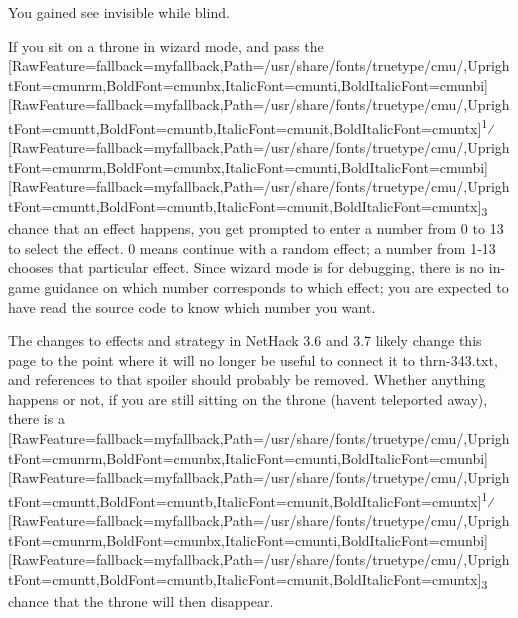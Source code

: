 \begin{myquote}
\item{}You gained see invisible while blind.
\end{myquote}

If you sit on a throne in wizard mode\footnotemark[64], and pass the \allowbreak{}\setmainfont{cmunrm.ttf}[RawFeature={fallback=myfallback},Path=/usr/share/fonts/truetype/cmu/,UprightFont=cmunrm,BoldFont=cmunbx,ItalicFont=cmunti,BoldItalicFont=cmunbi]\setmonofont{cmunrm.ttf}[RawFeature={fallback=myfallback},Path=/usr/share/fonts/truetype/cmu/,UprightFont=cmuntt,BoldFont=cmuntb,ItalicFont=cmunit,BoldItalicFont=cmuntx]\textsuperscript{1}⁄\allowbreak{}\setmainfont{cmunrm.ttf}[RawFeature={fallback=myfallback},Path=/usr/share/fonts/truetype/cmu/,UprightFont=cmunrm,BoldFont=cmunbx,ItalicFont=cmunti,BoldItalicFont=cmunbi]\setmonofont{cmunrm.ttf}[RawFeature={fallback=myfallback},Path=/usr/share/fonts/truetype/cmu/,UprightFont=cmuntt,BoldFont=cmuntb,ItalicFont=cmunit,BoldItalicFont=cmuntx]\textsubscript{3} chance that an effect happens, you get prompted to enter a number from 0 to 13 to select the effect. 0 means continue with a random effect; a number from 1-{}13 chooses that particular effect. Since wizard mode is for debugging, there is no in-{}game guidance on which number corresponds to which effect; you are expected to have read the source code to know which number you want.



The changes to effects and strategy in NetHack 3.6 and 3.7 likely change this page to the point where it will no longer be useful to connect it to thrn-{}343.txt, and references to that spoiler should probably be removed.
Whether anything happens or not, if you are still sitting on the throne (haven\textquotesingle{}t teleported away), there is a \allowbreak{}\setmainfont{cmunrm.ttf}[RawFeature={fallback=myfallback},Path=/usr/share/fonts/truetype/cmu/,UprightFont=cmunrm,BoldFont=cmunbx,ItalicFont=cmunti,BoldItalicFont=cmunbi]\setmonofont{cmunrm.ttf}[RawFeature={fallback=myfallback},Path=/usr/share/fonts/truetype/cmu/,UprightFont=cmuntt,BoldFont=cmuntb,ItalicFont=cmunit,BoldItalicFont=cmuntx]\textsuperscript{1}⁄\allowbreak{}\setmainfont{cmunrm.ttf}[RawFeature={fallback=myfallback},Path=/usr/share/fonts/truetype/cmu/,UprightFont=cmunrm,BoldFont=cmunbx,ItalicFont=cmunti,BoldItalicFont=cmunbi]\setmonofont{cmunrm.ttf}[RawFeature={fallback=myfallback},Path=/usr/share/fonts/truetype/cmu/,UprightFont=cmuntt,BoldFont=cmuntb,ItalicFont=cmunit,BoldItalicFont=cmuntx]\textsubscript{3} chance that the throne will then disappear.




